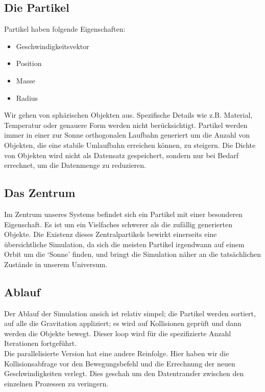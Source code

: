
\subsection{Die Partikel}
Partikel haben folgende Eigenschaften:
\begin{itemize}
    \item Geschwindigkeitsvektor
    \item Position
    \item Masse
    \item Radius
\end{itemize}
Wir gehen von sphärischen Objekten aus. Spezifische Details wie z.B.
Material, Temperatur oder genauere Form werden nicht berücksichtigt.
Partikel werden immer in einer zur Sonne orthogonalen Laufbahn generiert
um die Anzahl von Objekten, die eine stabile Umlaufbahn erreichen können,
zu steigern. Die Dichte von Objekten wird nicht als Datensatz gespeichert,
sondern nur bei Bedarf errechnet, um die Datenmenge zu reduzieren.

\subsection{Das Zentrum}
Im Zentrum unseres Systems befindet sich ein Partikel mit einer besonderen
Eigenschaft. Es ist um ein Vielfaches schwerer als die zufällig generierten Objekte.
Die Existenz dieses Zentralpartikels bewirkt einerseits eine übersichtliche Simulation,
da sich die meisten Partikel irgendwann auf einem Orbit um die `Sonne' finden,
und bringt die Simulation näher an die tatsächlichen Zustände in unserem Universum.

\subsection{Ablauf}
Der Ablauf der Simulation ansich ist relativ simpel; die Partikel werden sortiert,
auf alle die Gravitation appliziert; es wird auf Kollisionen geprüft und dann werden
die Objekte bewegt. Dieser loop wird für die spezifizierte Anzahl Iterationen
fortgeführt.
\\
Die parallelisierte Version hat eine andere Reinfolge.
Hier haben wir die Kollisionsabfrage vor den Bewegungsbefehl und die Errechnung
der neuen Geschwindigkeiten verlegt. Dies geschah um den Datentransfer zwischen
den einzelnen Prozessen zu veringern.

